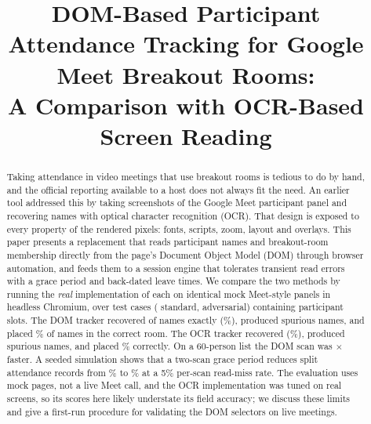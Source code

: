 \documentclass[conference]{IEEEtran}
\begin{document}
\title{DOM-Based Participant Attendance Tracking for Google Meet Breakout Rooms:\\
A Comparison with OCR-Based Screen Reading}

\author{
}

\maketitle

\begin{abstract}
Taking attendance in video meetings that use breakout rooms is tedious to do by hand, and the official reporting available to a host does not always fit the need. An earlier tool addressed this by taking screenshots of the Google Meet participant panel and recovering names with optical character recognition (OCR). That design is exposed to every property of the rendered pixels: fonts, scripts, zoom, layout and overlays. This paper presents a replacement that reads participant names and breakout-room membership directly from the page's Document Object Model (DOM) through browser automation, and feeds them to a session engine that tolerates transient read errors with a grace period and back-dated leave times. We compare the two methods by running the \emph{real} implementation of each on identical mock Meet-style panels in headless Chromium, over \nCases{} test cases (\nStd{} standard, \nAdv{} adversarial) containing \nSlots{} participant slots. The DOM tracker recovered \domFound{} of \nSlots{} names exactly (\domRec\%), produced \domSpur{} spurious names, and placed \domRoom\% of names in the correct room. The OCR tracker recovered \ocrFound{} (\ocrRec\%), produced \ocrSpur{} spurious names, and placed \ocrRoom\% correctly. On a 60-person list the DOM scan was \speedup$\times$ faster. A seeded simulation shows that a two-scan grace period reduces split attendance records from \GOnePZeroFiveFrag\% to \GTwoPZeroFiveFrag\% at a 5\% per-scan read-miss rate. The evaluation uses mock pages, not a live Meet call, and the OCR implementation was tuned on real screens, so its scores here likely understate its field accuracy; we discuss these limits and give a first-run procedure for validating the DOM selectors on live meetings.
\end{abstract}
\end{document}
